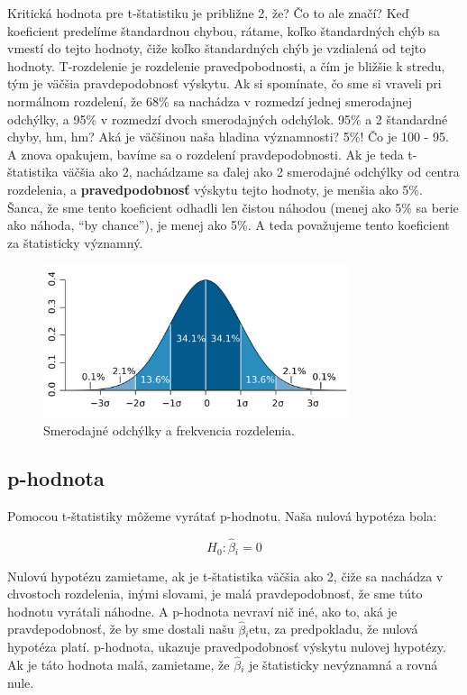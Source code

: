 Kritická hodnota pre t-štatistiku je približne 2, že? Čo to ale značí?
Keď koeficient predelíme štandardnou chybou, rátame, koľko štandardných
chýb sa vmestí do tejto hodnoty, čiže koľko štandardných chýb je
vzdialená od tejto hodnoty. T-rozdelenie je rozdelenie pravedpobodnosti,
a čím je bližšie k stredu, tým je väčšia pravdepodobnosť výskytu. Ak si
spomínate, čo sme si vraveli pri normálnom rozdelení, že 68\% sa
nachádza v rozmedzí jednej smerodajnej odchýlky, a 95\% v rozmedzí dvoch
smerodajných odchýlok. 95\% a 2 štandardné chyby, hm, hm? Aká je
väčšinou naša hladina významnosti? 5\%! Čo je 100 - 95. A znova
opakujem, bavíme sa o rozdelení pravdepodobnosti. Ak je teda
t-štatistika väčšia ako 2, nachádzame sa ďalej ako 2 smerodajné odchýlky
od centra rozdelenia, a \textbf{pravedpodobnosť} výskytu tejto hodnoty,
je menšia ako 5\%. Šanca, že sme tento koeficient odhadli len čistou
náhodou (menej ako 5\% sa berie ako náhoda, ``by chance''), je menej ako
5\%. A teda považujeme tento koeficient za štatisticky významný.

\begin{figure}
\begin{center}

\includegraphics[width=0.8\textwidth,height=\textheight]{diplomka obrazky/8.png}
\caption{Smerodajné odchýlky a frekvencia rozdelenia.}
\end{center}
\end{figure}

\newpage

\hypertarget{p-hodnota}{%
\subsection{p-hodnota}\label{p-hodnota}}

Pomocou t-štatistiky môžeme vyrátať p-hodnotu. Naša nulová hypotéza
bola:

\[H_0: \hat\beta{}_i = 0\]

Nulovú hypotézu zamietame, ak je t-štatistika väčšia ako 2, čiže sa
nachádza v chvostoch rozdelenia, inými slovami, je malá pravdepodobnosť,
že sme túto hodnotu vyrátali náhodne. A p-hodnota nevraví nič iné, ako
to, aká je pravdepodobnosť, že by sme dostali našu \(\hat\beta{}_i\)etu,
za predpokladu, že nulová hypotéza platí. p-hodnota, ukazuje
pravedpodobnosť výskytu nulovej hypotézy. Ak je táto hodnota malá,
zamietame, že \(\hat\beta{}_i\) je štatisticky nevýznamná a rovná nule.

